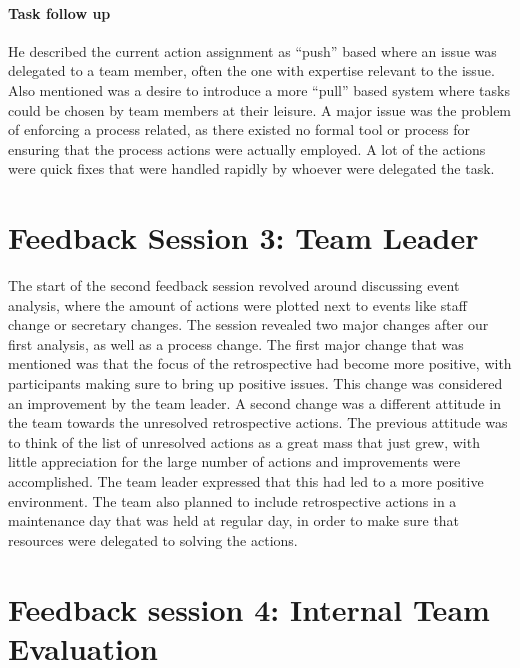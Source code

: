 \paragraph{Task follow up}
He described the current action assignment as ``push'' based where an issue was delegated to a team member, often the one with expertise relevant to the issue. Also mentioned was a desire to introduce a more ``pull'' based system where tasks could be chosen by team members at their leisure. A major issue was the problem of enforcing a process related, as there existed no formal tool or process for ensuring that the process actions were actually employed. A lot of the actions were quick fixes that were handled rapidly by whoever were delegated the task.
\clearpage

\section{Feedback Session 3: Team Leader}
\label{second-feedback-results}
The start of the second feedback session revolved around discussing event analysis, where the amount of actions were plotted next to events like staff change or secretary changes.  The session revealed two major changes after our first analysis, as well as a process change. The first major change that was mentioned was that the focus of the retrospective had become more positive, with participants making sure to bring up positive issues. This change was considered an improvement by the team leader. A second change was a different attitude in the team towards the unresolved retrospective actions. The previous attitude was to think of the list of unresolved actions as a great mass that just grew, with little appreciation for the large number of actions and improvements were accomplished. The team leader expressed that this had led to a more positive environment. The team also planned to include retrospective actions in a maintenance day that was held at regular day, in order to make sure that resources were delegated to solving the actions. 


\section{Feedback session 4: Internal Team Evaluation}
\label{section:feedback-session 4}


